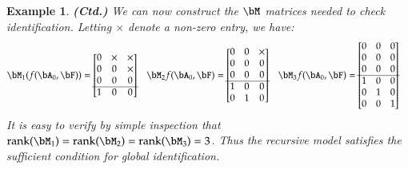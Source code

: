 \documentclass [12pt]{article}
\newtheorem{example}{Example}
\newcommand{\rank}{\mathrm{rank}}
\begin{document}
    \setcounter{example}{2}
    \begin{example}{\textbf{(Ctd.)}}
        We can now construct the $\bM$ matrices needed to check identification. Letting $\times$ denote a non-zero entry, we have:
        \begin{align*}
           \bM_1( f( \bA_0, \bF ) ) &= \begin{bmatrix} 0 & \times & \times \\ 0 & 0 & \times \\ 0 & 0 & 0 \\ \hline 1 & 0 & 0 \end{bmatrix}
           &
           \bM_2 f( \bA_0, \bF ) &= \begin{bmatrix} 0 & 0 & \times \\ 0 & 0 & 0 \\ 0 & 0 & 0 \\ \hline 1 & 0 & 0 \\ 0 & 1 & 0 \end{bmatrix}
           &
           \bM_3 f( \bA_0, \bF ) &= \begin{bmatrix} 0 & 0 & 0 \\ 0 & 0 & 0 \\ 0 & 0 & 0 \\ \hline 1 & 0 & 0 \\ 0 & 1 & 0 \\ 0 & 0 & 1 \end{bmatrix} 
        \end{align*}
        It is easy to verify by simple inspection that $\rank( \bM_1 ) = \rank( \bM_2 ) = \rank( \bM_3 ) = 3$. Thus the recursive model satisfies the sufficient condition for global identification.
    \end{example}
    
\end{document}
